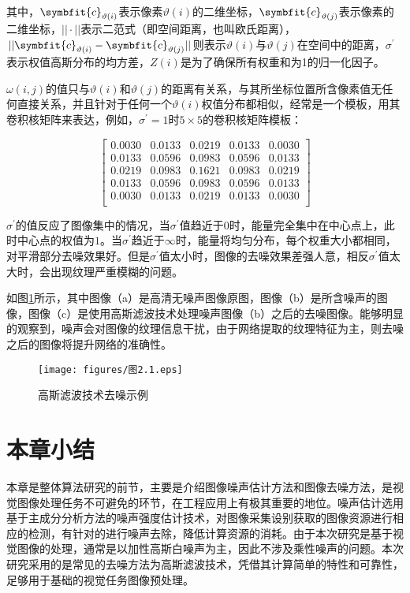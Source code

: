 其中，$\symbfit{c}_{\vartheta\left(i\right)}$表示像素$\vartheta\left(i\right)$的二维坐标，$\symbfit{c}_{\vartheta\left(j\right)}$表示像素的二维坐标，$||\cdot||$表示二范式（即空间距离，也叫欧氏距离），$\left.|{|\symbfit{c}}_{\vartheta\left(i\right)}-\symbfit{c}_{\vartheta\left(j\right)}||\right.$则表示$\vartheta\left(i\right)与\vartheta\left(j\right)$在空间中的距离，$\sigma^\prime$表示权值高斯分布的均方差，$Z\left(i\right)$是为了确保所有权重和为1的归一化因子。

$\omega\left(i,j\right)$的值只与$\vartheta\left(i\right)$和$\vartheta\left(j\right)$的距离有关系，与其所坐标位置所含像素值无任何直接关系，并且针对于任何一个$\vartheta\left(i\right)$权值分布都相似，经常是一个模板，用其卷积核矩阵来表达，例如，$\sigma^\prime=1$时$5\times5$的卷积核矩阵模板：


$$
\left[\begin{matrix}0.0030&0.0133&0.0219&0.0133&0.0030\\0.0133&0.0596&0.0983&0.0596&0.0133\\0.0219&0.0983&0.1621&0.0983&0.0219\\0.0133&0.0596&0.0983&0.0596&0.0133\\0.0030&0.0133&0.0219&0.0133&0.0030\\\end{matrix}\right]
$$


$\sigma^\prime$的值反应了图像集中的情况，当$\sigma^\prime$值趋近于$0$时，能量完全集中在中心点上，此时中心点的权值为$1$。当$\sigma^\prime$趋近于$\infty$时，能量将均匀分布，每个权重大小都相同，对平滑部分去噪效果好。但是$\sigma^\prime$值太小时，图像的去噪效果差强人意，相反$\sigma^\prime$值太大时，会出现纹理严重模糊的问题。

如图\ref{图2.1}所示，其中图像（a）是高清无噪声图像原图，图像（b）是所含噪声的图像，图像（c）是使用高斯滤波技术处理噪声图像（b）之后的去噪图像。能够明显的观察到，噪声会对图像的纹理信息干扰，由于网络提取的纹理特征为主，则去噪之后的图像将提升网络的准确性。


\begin{figure}[!ht]
	\centering
	\texttt{[image: figures/图2.1.eps]}
	\caption{高斯滤波技术去噪示例}\label{图2.1}
\end{figure}

\section{本章小结}

本章是整体算法研究的前节，主要是介绍图像噪声估计方法和图像去噪方法，是视觉图像处理任务不可避免的环节，在工程应用上有极其重要的地位。噪声估计选用基于主成分分析方法的噪声强度估计技术，对图像采集设别获取的图像资源进行相应的检测，有针对的进行噪声去除，降低计算资源的消耗。由于本次研究是基于视觉图像的处理，通常是以加性高斯白噪声为主，因此不涉及乘性噪声的问题。本次研究采用的是常见的去噪方法为高斯滤波技术，凭借其计算简单的特性和可靠性，足够用于基础的视觉任务图像预处理。













